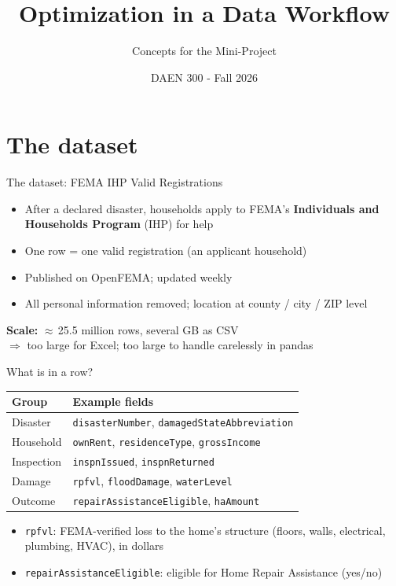 \documentclass[aspectratio=43,11pt]{beamer}
\title{Optimization in a Data Workflow}
\subtitle{Concepts for the Mini-Project}
\author{DAEN 300 - Fall 2026}
\date{}
\begin{document}
\begin{frame}
  \titlepage
\end{frame}

\section{The dataset}

\begin{frame}{The dataset: FEMA IHP Valid Registrations}
  \begin{itemize}
    \item After a declared disaster, households apply to FEMA's
          \textbf{Individuals and Households Program} (IHP) for help
    \item One row = one valid registration (an applicant household)
    \item Published on OpenFEMA; updated weekly
    \item All personal information removed; location at county / city / ZIP level
  \end{itemize}
  \vspace{0.8em}
  \textbf{Scale:} $\approx$\,25.5 million rows, several GB as CSV \\
  $\Rightarrow$ too large for Excel; too large to handle carelessly in pandas
\end{frame}

\begin{frame}{What is in a row?}
  \centering
  \small
  \begin{tabular}{@{}ll@{}}
    \toprule
    Group & Example fields \\
    \midrule
    Disaster  & \texttt{disasterNumber}, \texttt{damagedStateAbbreviation} \\
    Household & \texttt{ownRent}, \texttt{residenceType}, \texttt{grossIncome} \\
    Inspection & \texttt{inspnIssued}, \texttt{inspnReturned} \\
    Damage    & \texttt{rpfvl}, \texttt{floodDamage}, \texttt{waterLevel} \\
    Outcome   & \texttt{repairAssistanceEligible}, \texttt{haAmount} \\
    \bottomrule
  \end{tabular}
  \vspace{1em}
  \raggedright
  \begin{itemize}
    \item \texttt{rpfvl}: FEMA-verified loss to the home's structure
          (floors, walls, electrical, plumbing, HVAC), in dollars
    \item \texttt{repairAssistanceEligible}: eligible for Home Repair Assistance (yes/no)
  \end{itemize}
\end{frame}
\end{document}
